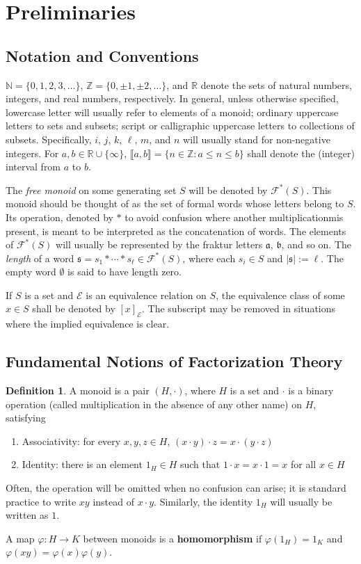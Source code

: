 \documentclass{report}
\renewcommand{\aa}{\mathfrak{a}}
\newcommand{\bb}{\mathfrak{b}}
\newcommand{\E}{\mathcal{E}}
\newcommand{\F}{\mathcal{F}}
\newcommand{\NN}{\mathbb{N}}
\newcommand{\RR}{\mathbb{R}}
\newcommand{\ZZ}{\mathbb{Z}}
\newcommand{\llb}{\llbracket}
\newcommand{\rrb}{\rrbracket}
\renewcommand{\:}{\text{:}}
\theoremstyle{definition}
\newtheorem{defn}{Definition}[section]
\begin{document}
\section{Preliminaries}
\subsection*{Notation and Conventions}

$\NN = \{0,1,2,3,\dots\}$, $\ZZ = \{0,\pm 1, \pm 2,\dots\}$, and $\RR$ denote the sets of natural numbers, integers, and real numbers, respectively.
In general, unless otherwise specified, lowercase letter will usually refer to elements of a monoid; ordinary uppercase letters to sets and subsets; script or calligraphic uppercase letters to collections of subsets.
Specifically, $i$, $j$, $k$, $\ell$, $m$, and $n$ will usually stand for non-negative integers.
For $a, b\in \RR\cup\{\infty\}$, $\llb a,b \rrb = \{ n\in \ZZ : a \le n \le b \}$ shall denote the (integer) interval from $a$ to $b$.

The \textit{free monoid} on some generating set $S$ will be denoted by $\F^*(S)$.  
This monoid should be thought of as the set of formal words whose letters belong to $S$.
Its operation, denoted by $*$ to avoid confusion where another multiplicationmis present, is meant to be interpreted as the concatenation of words.
The elements of $\F^*(S)$ will usually be represented by the fraktur letters $\aa$, $\bb$, and so on.  
The \textit{length} of a word $\mathfrak{s}= s_1 * \cdots * s_\ell  \in \F^*(S)$, where each $s_i\in S$ and $| \mathfrak{s} | := \ell$.
The empty word $\emptyset$ is said to have length zero.

If $S$ is a set and $\E$ is an equivalence relation on $S$, the equivalence class of some $x\in S$ shall be denoted by $[x]_\E$.
The subscript may be removed in situations where the implied equivalence is clear.

\subsection*{Fundamental Notions of Factorization Theory}
\begin{defn}
A monoid is a pair $(H,\cdot)$, where $H$ is a set and $\cdot $ is a binary operation (called multiplication in the absence of any other name) on $H$, satisfying
\begin{enumerate}
\item Associativity: for every $x,y,z \in H$, $(x\cdot y)\cdot z = x\cdot (y\cdot z)$
\item Identity: there is an element $1_H\in H$ such that $1\cdot x = x\cdot 1 = x$ for all $x\in H$
\end{enumerate}
Often, the operation will be omitted when no confusion can arise; it is standard practice to write $xy$ instead of $x \cdot y$.
Similarly, the identity $1_H$ will usually be written as $1$.

A map $\varphi: H \to K$ between monoids is a \textbf{homomorphism} if $\varphi(1_H) = 1_K$ and $\varphi(xy) = \varphi(x)\varphi(y)$.
\end{defn}
\end{document}
